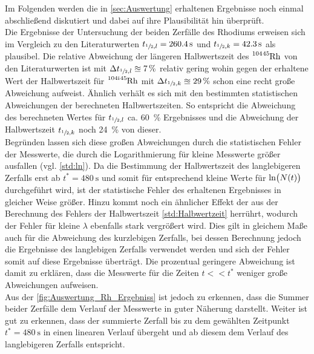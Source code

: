 Im Folgenden werden die in \cref{sec:Auswertung} erhaltenen Ergebnisse noch einmal 
abschließend diskutiert und dabei auf ihre Plausibilität hin überprüft.\\


Die Ergebnisse der Untersuchung der beiden Zerfälle des Rhodiums erweisen sich im Vergleich 
zu den Literaturwerten \cite{NuklidKarte_Rh} $t_{\sfrac{1}{2},l} = \SI{260.4}{\second}$ und
$t_{\sfrac{1}{2},k} = \SI{42.3}{\second}$ als plausibel. Die relative Abweichung der
längeren Halbwertszeit des $\ce{^{104}^{45}Rh}$ von den Literaturwerten ist mit $\Delta t_{\sfrac{1}{2},l} \approxeq 
\SI{7}{\percent}$ relativ gering wohin gegen der erhaltene Wert der Halbwertszeit für  $\ce{^{104i}^{45}Rh}$
mit $\Delta t_{\sfrac{1}{2},k} \approxeq \SI{29}{\percent}$ schon eine recht große Abweichung aufweist.
Ähnlich verhält es sich mit den bestimmten statistischen Abweichungen der berechneten 
Halbwertszeiten. So entspricht die Abweichung des berechneten Wertes für $t_{\sfrac{1}{2},l}$ 
ca. \SI{60}{\percent} Ergebnisses und die Abweichung der Halbwertszeit $t_{\sfrac{1}{2},k}$ 
noch \SI{24}{\percent} von dieser.\\
Begründen lassen sich diese großen Abweichungen durch die statistischen Fehler der Messwerte,
die durch die Logarithmierung für kleine Messwerte größer ausfallen (vgl. \cref{std:ln}).
Da die Bestimmung der Halbwertszeit des langlebigeren Zerfalls erst ab $t^{*} = \SI{480}{\second}$
und somit für entsprechend kleine Werte für $\Ln{N(t)}$ durchgeführt wird, ist der statistische 
Fehler des erhaltenen Ergebnisses in gleicher Weise größer. Hinzu kommt noch ein ähnlicher Effekt  
der aus der Berechnung des Fehlers der Halbwertszeit \cref{std:Halbwertzeit} herrührt, wodurch der 
Fehler für kleine $\lambda$ ebenfalls stark vergrößert wird.
Dies gilt in gleichem Maße auch für die Abweichung des kurzlebigen Zerfalls, bei dessen Berechnung
jedoch die Ergebnisse des langlebigen Zerfalls verwendet werden und sich der Fehler somit auf diese
Ergebnisse überträgt. Die prozentual geringere Abweichung ist damit zu erklären, dass die Messwerte
für die Zeiten $t << t^{*}$ weniger große Abweichungen aufweisen.\\

Aus der \cref{fig:Auswertung_Rh_Ergebniss} ist jedoch zu erkennen, dass die Summer beider Zerfälle dem 
Verlauf der Messwerte in guter Näherung darstellt. Weiter ist gut zu erkennen, dass der summierte 
Zerfall bis zu dem gewählten Zeitpunkt $t^{*} = \SI{480}{\second}$ in einen linearen Verlauf 
übergeht und ab diesem dem Verlauf des langlebigeren Zerfalls entspricht. 